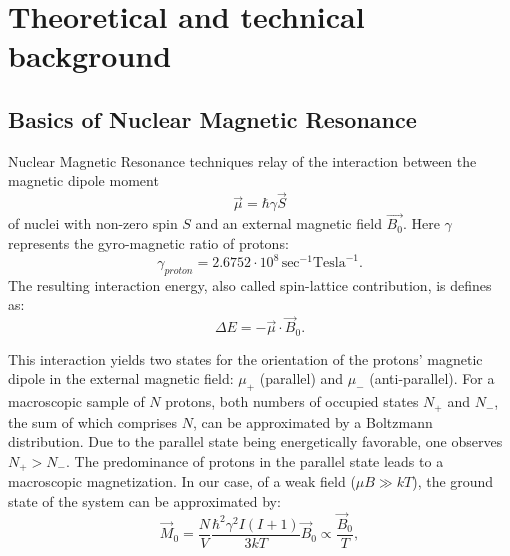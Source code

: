 \section{Theoretical and technical background}
\subsection{Basics of Nuclear Magnetic Resonance}

Nuclear Magnetic Resonance techniques relay of the interaction between the magnetic dipole moment
\begin{equation}
\label{magnetic dipole moment}
\vec{\mu} = \hbar\gamma\vec{S} 
\end{equation}
 of nuclei with non-zero spin $S$ and an external magnetic field $\vec{B_0}$. Here $\gamma$ represents the gyro-magnetic ratio of protons:
$$ \gamma_{proton} = 2.6752 \cdot 10^8 \, \textrm{sec}^{-1}\textrm{Tesla}^{-1}.
$$The resulting interaction energy, also called spin-lattice contribution, is defines as:
\begin{equation}
\label{interaction energy}
\Delta E = -\vec{\mu}\cdot\vec{B}_0.
\end{equation}

This interaction yields two states for the orientation of the protons' magnetic dipole in the external magnetic field: $\mu_+$ (parallel) and $\mu_-$ (anti-parallel).
For a macroscopic sample of $N$ protons, both numbers of occupied states $N_+$ and $N_-$, the sum of which comprises $N$, can be approximated by a Boltzmann distribution.
Due to the parallel state being energetically favorable, one observes $N_+>N_-$. The predominance of protons in the parallel state leads to a macroscopic magnetization.
In our case, of a weak field ($\mu B \gg kT$), the ground state of the system can be approximated by:
\begin{equation}
\label{ground state approx}
\vec{M}_0 = \frac{N}{V} \frac{\hbar^2 \gamma^2 I(I+1)}{3kT}\vec{B}_0 \propto \frac{\vec{B}_0}{T},
\end{equation}

